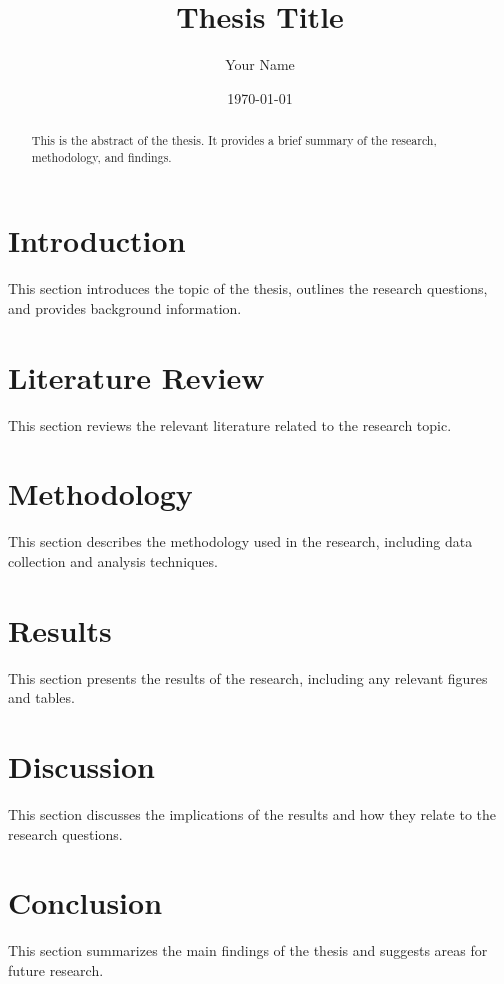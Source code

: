 \documentclass{article}
\title{Thesis Title}
\author{Your Name}
\date{\today}
\begin{document}
\maketitle

\begin{abstract}
This is the abstract of the thesis. It provides a brief summary of the research, methodology, and findings.
\end{abstract}

\section{Introduction}
This section introduces the topic of the thesis, outlines the research questions, and provides background information.

\section{Literature Review}
This section reviews the relevant literature related to the research topic.

\section{Methodology}
This section describes the methodology used in the research, including data collection and analysis techniques.

\section{Results}
This section presents the results of the research, including any relevant figures and tables.

\section{Discussion}
This section discusses the implications of the results and how they relate to the research questions.

\section{Conclusion}
This section summarizes the main findings of the thesis and suggests areas for future research.



\end{document}
